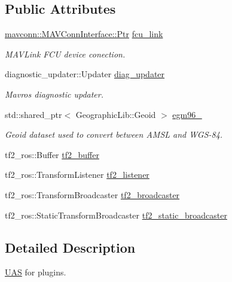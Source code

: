 \subsection*{Public Attributes}
\begin{DoxyCompactItemize}
\item 
\mbox{\hyperlink{group__mavconn_gaff41078b805e1d8f85ed6fd2d87711ce}{mavconn\+::\+M\+A\+V\+Conn\+Interface\+::\+Ptr}} \mbox{\hyperlink{group__nodelib_gafc058c8fb3e90f26a88fdd808e1b3dac}{fcu\+\_\+link}}
\begin{DoxyCompactList}\small\item\em M\+A\+V\+Link F\+CU device conection. \end{DoxyCompactList}\item 
diagnostic\+\_\+updater\+::\+Updater \mbox{\hyperlink{group__nodelib_ga57e8229b5f18563820ff4ee5335d57a5}{diag\+\_\+updater}}
\begin{DoxyCompactList}\small\item\em Mavros diagnostic updater. \end{DoxyCompactList}\item 
std\+::shared\+\_\+ptr$<$ Geographic\+Lib\+::\+Geoid $>$ \mbox{\hyperlink{group__nodelib_ga35622da9e1bf22e43b269fbcbce65c40}{egm96\+\_}}
\begin{DoxyCompactList}\small\item\em Geoid dataset used to convert between A\+M\+SL and W\+G\+S-\/84. \end{DoxyCompactList}\item 
tf2\+\_\+ros\+::\+Buffer \mbox{\hyperlink{group__nodelib_ga9c221ed548579fd2008fd1ac4d2b13e3}{tf2\+\_\+buffer}}
\item 
tf2\+\_\+ros\+::\+Transform\+Listener \mbox{\hyperlink{group__nodelib_gaa3606f3a1043f5a4666d2d922cbb170a}{tf2\+\_\+listener}}
\item 
tf2\+\_\+ros\+::\+Transform\+Broadcaster \mbox{\hyperlink{group__nodelib_gaea0896a0daef68618142861b79395156}{tf2\+\_\+broadcaster}}
\item 
tf2\+\_\+ros\+::\+Static\+Transform\+Broadcaster \mbox{\hyperlink{group__nodelib_gad3a9ec1f5de439f1c43ade0b851bae38}{tf2\+\_\+static\+\_\+broadcaster}}
\end{DoxyCompactItemize}


\subsection{Detailed Description}
\mbox{\hyperlink{classmavros_1_1UAS}{U\+AS}} for plugins. 

